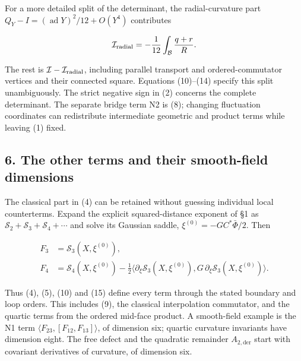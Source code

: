 \documentclass[11pt,a4paper]{article}
\begin{document}
For a more detailed split of the determinant, the radial-curvature part
\(Q_Y-I=(\operatorname{ad}Y)^2/12+O(Y^4)\) contributes

\[\mathcal I_{\rm radial}
=-\frac1{12}\int_{\mathcal B}\frac{q+r}{R}.\]

The rest is \(\mathcal I-\mathcal I_{\rm radial}\), including parallel
transport and ordered-commutator vertices and their connected square.
Equations (10)--(14) specify this split unambiguously. The strict
negative sign in (2) concerns the complete determinant. The separate
bridge term N2 is (8); changing fluctuation coordinates can redistribute
intermediate geometric and product terms while leaving (1) fixed.

\hypertarget{the-other-terms-and-their-smooth-field-dimensions}{%
\subsection{6. The other terms and their smooth-field
dimensions}\label{the-other-terms-and-their-smooth-field-dimensions}}

The classical part in (4) can be retained without guessing individual
local counterterms. Expand the explicit squared-distance exponent of §1
as \(\mathcal S_2+\mathcal S_3+\mathcal S_4+\cdots\) and solve its
Gaussian saddle, \(\xi^{(0)}=-G C^*\bar\Phi/2\). Then

\[\begin{aligned}
F_3&=\mathcal S_3(X,\xi^{(0)}),\\
F_4&=\mathcal S_4(X,\xi^{(0)})-
\frac12\langle\partial_\xi\mathcal S_3(X,\xi^{(0)}),
G\,\partial_\xi\mathcal S_3(X,\xi^{(0)})\rangle.
\end{aligned}\tag{15}\]

Thus (4), (5), (10) and (15) define every term through the stated
boundary and loop orders. This includes (9), the classical interpolation
commutator, and the quartic terms from the ordered mid-face product. A
smooth-field example is the N1 term
\(\langle F_{23},[F_{12},F_{13}]\rangle\), of dimension six; quartic
curvature invariants have dimension eight. The free defect and the
quadratic remainder \(A_{2,\mathrm{der}}\) start with covariant
derivatives of curvature, of dimension six.
\end{document}
